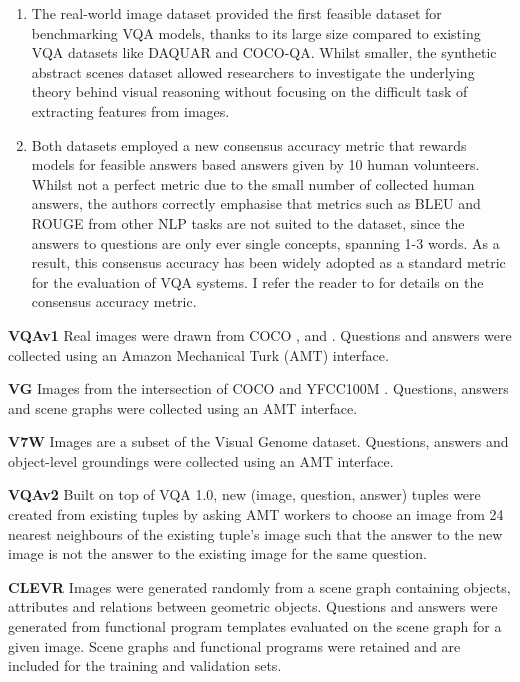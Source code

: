 \begin{enumerate}
    \item The real-world image dataset provided the first feasible dataset for benchmarking VQA models, thanks to its large size compared to existing VQA datasets like DAQUAR and COCO-QA. Whilst smaller, the synthetic abstract scenes dataset allowed researchers to investigate the underlying theory behind visual reasoning without focusing on the difficult task of extracting features from images.
    \item Both datasets employed a new consensus accuracy metric that rewards models for feasible answers based answers given by 10 human volunteers. Whilst not a perfect metric due to the small number of collected human answers, the authors correctly emphasise that metrics such as BLEU and ROUGE from other NLP tasks are not suited to the dataset, since the answers to questions are only ever single concepts, spanning 1-3 words. As a result, this consensus accuracy has been widely adopted as a standard metric for the evaluation of VQA systems. I refer the reader to \subsectionautorefname{ \ref{subsection:consensus_measures}} for details on the consensus accuracy metric.
\end{enumerate}

\textbf{VQAv1} \cite{antol2015vqa} Real images were drawn from COCO \cite{lin2014microsoft}, and . Questions and answers were collected using an Amazon Mechanical Turk (AMT) interface.

\textbf{VG} \cite{krishna2017visual} Images from the intersection of COCO \cite{lin2014microsoft} and YFCC100M \cite{thomee2016yfcc100m}. Questions, answers and scene graphs were collected using an AMT interface.

\textbf{V7W} \cite{zhu2016visual7w} Images are a subset of the Visual Genome dataset. Questions, answers and object-level groundings were collected using an AMT interface.

\textbf{VQAv2} \cite{goyal2017making, zhang2016yin} Built on top of VQA 1.0, new (image, question, answer) tuples were created from existing tuples by asking AMT workers to choose an image from 24 nearest neighbours of the existing tuple's image such that the answer to the new image is not the answer to the existing image for the same question.

\textbf{CLEVR} \cite{johnson2017clevr} Images were generated randomly from a scene graph containing objects, attributes and relations between geometric objects. Questions and answers were generated from functional program templates evaluated on the scene graph for a given image. Scene graphs and functional programs were retained and are included for the training and validation sets.

